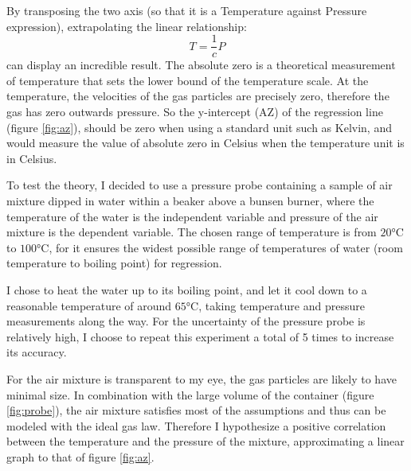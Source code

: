 \documentclass[a4paper,12pt]{article}
\begin{document}
By transposing the two axis (so that it is a Temperature against Pressure expression), extrapolating the linear relationship:
\[
    T = \frac{1}{c}P
\]
can display an incredible result. The absolute zero is a theoretical measurement of temperature that sets the lower bound of the temperature scale. At the temperature, the velocities of the gas particles are precisely zero, therefore the gas has zero outwards pressure. So the y-intercept (AZ) of the regression line (figure \ref{fig:az}), should be zero when using a standard unit such as Kelvin, and would measure the value of absolute zero in Celsius when the temperature unit is in Celsius.




To test the theory, I decided to use a pressure probe containing a sample of air mixture dipped in water within a beaker above a bunsen burner, where the temperature of the water is the independent variable and pressure of the air mixture is the dependent variable. The chosen range of temperature is from $20\si{\celsius}$ to $100\si{\celsius}$, for it ensures the widest possible range of temperatures of water (room temperature to boiling point) for regression.

I chose to heat the water up to its boiling point, and let it cool down to a reasonable temperature of around $65\si{\celsius}$, taking temperature and pressure measurements along the way. For the uncertainty of the pressure probe is relatively high, I choose to repeat this experiment a total of 5 times to increase its accuracy.

For the air mixture is transparent to my eye, the gas particles are likely to have minimal size. In combination with the large volume of the container (figure \ref{fig:probe}), the air mixture satisfies most of the assumptions and thus can be modeled with the ideal gas law. Therefore I hypothesize a positive correlation between the temperature and the pressure of the mixture, approximating a linear graph to that of figure \ref{fig:az}.
\end{document}
